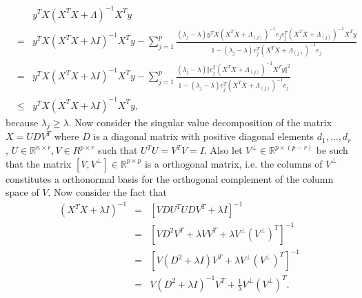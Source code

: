 \documentclass[noinfoline,11pt]{imsart}
\numberwithin{equation}{section}
\theoremstyle{plain}
\newcommand{\lmLambda}{\Lambda}
\newcommand{\lmlambda}{\lambda}
\newcommand{\lmX}{X}
\newcommand{\lmy}{y}
\newcommand{\lmU}{U}
\newcommand{\lmV}{V}
\newcommand{\lmD}{D}
\newcommand{\R}{\mathbb{R}}
\newcommand{\norm}[1]{ \Vert #1 \Vert }
\newcommand{\lme}{e}
\begin{document}
\begin{eqnarray}\label{eq:lmIneqDiagIdentity}
& & \lmy^T \lmX \left( \lmX^T\lmX+\lmLambda \right)^{-1} \lmX^T \lmy \nonumber\\
& = & \lmy^T \lmX \left( \lmX^T\lmX+\lmlambda I\right)^{-1} \lmX^T \lmy  - \sum_{j=1}^{p}\frac{(\lmlambda_j-\lmlambda)   \lmy^T \lmX\left( \lmX^T\lmX+\lmLambda_{(j)}\right)^{-1} \lme_j\lme_j^T \left( \lmX^T\lmX+\lmLambda_{(j)}\right)^{-1} \lmX^T \lmy  }{ 1- (\lmlambda_j-\lmlambda) \lme_j^T \left( \lmX^T\lmX+\lmLambda_{(j)}\right)^{-1} \lme_j    }\nonumber\\
& = & \lmy^T \lmX \left( \lmX^T\lmX+\lmlambda I\right)^{-1} \lmX^T \lmy  - \sum_{j=1}^{p}\frac{(\lmlambda_j-\lmlambda)   \norm{\lme_j^T \left( \lmX^T\lmX+\lmLambda_{(j)}\right)^{-1} \lmX^T \lmy }^2 }{ 1- (\lmlambda_j-\lmlambda) \lme_j^T \left( \lmX^T\lmX+\lmLambda_{(j)}\right)^{-1} \lme_j    } \nonumber\\
& \leq & \lmy^T \lmX \left( \lmX^T\lmX+\lmlambda I\right)^{-1} \lmX^T \lmy, 
\end{eqnarray}
because $\lmlambda_j\geq \lmlambda$.  
Now consider the singular value decomposition of the matrix $\lmX=\lmU \lmD\lmV^T$ where $\lmD$ is a diagonal matrix with positive diagonal elements $d_1, \ldots , d_r$, $\lmU\in \R^{n\times r}, \lmV\in R^{p\times r}$ such that  $\lmU^T\lmU =\lmV^T\lmV=I$. Also let $\lmV^{\perp} \in \R^{p\times (p-r)}$ be  such that the matrix  $\left[ \lmV , \lmV^{\perp}\right] \in \R^{p\times p}$ is a orthogonal matrix, i.e. the columns of $\lmV^{\perp}$ constitutes a orthonormal basis for the orthogonal complement of the column space of $\lmV$.  Now consider the fact that 
\begin{eqnarray}
(\lmX^T\lmX+\lmlambda I )^{-1}
 & = & \left[ \lmV\lmD\lmU^T \lmU\lmD \lmV^T +\lmlambda I \right]^{-1} \nonumber\\
 & = & \left[ \lmV\lmD^2 \lmV^T +\lmlambda \lmV\lmV^T +\lmlambda \lmV^{\perp} (\lmV^{\perp})^T \right]^{-1} \nonumber\\
 & = & \left[ \lmV(\lmD^2+ \lmlambda I ) \lmV^T +\lmlambda \lmV^{\perp} (\lmV^{\perp})^T \right]^{-1} \nonumber\\
 & = & \lmV(\lmD^2+ \lmlambda I ) ^{-1}\lmV^T +\frac{1}{\lmlambda} \lmV^{\perp} (\lmV^{\perp})^T .\nonumber
\end{eqnarray}
\end{document}
